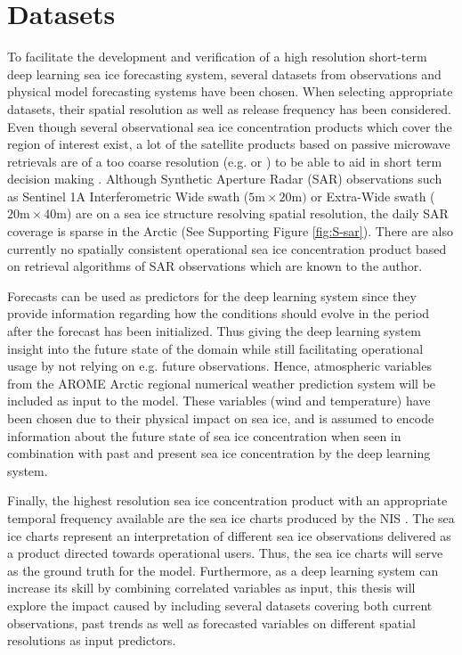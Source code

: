 \documentclass[../main/thesis.tex]{subfiles}
\begin{document}
\section{Datasets}
\label{sec:datasets}
To facilitate the development and verification of a high resolution short-term deep learning sea ice forecasting system, several datasets from observations and physical model forecasting systems have been chosen. When selecting appropriate datasets, their spatial resolution as well as release frequency has been considered. Even though several observational sea ice concentration products which cover the region of interest exist, a lot of the satellite products based on passive microwave retrievals are of a too coarse resolution (e.g. \citet{Lavergne2019} or \citet{Kern2019}) to be able to aid in short term decision making \citep{Wagner2020}. Although Synthetic Aperture Radar (SAR) observations such as Sentinel 1A Interferometric Wide swath ($5\text{m} \times 20\text{m})$ or Extra-Wide swath ($20\text{m} \times 40\text{m}$) are on a sea ice structure resolving spatial resolution, the daily SAR coverage is sparse in the Arctic (See Supporting Figure \ref{fig:S-sar}). There are also currently no spatially consistent operational sea ice concentration product based on retrieval algorithms of SAR observations which are known to the author.

Forecasts can be used as predictors for the deep learning system since they provide information regarding how the conditions should evolve in the period after the forecast has been initialized. Thus giving the deep learning system insight into the future state of the domain while still facilitating operational usage by not relying on e.g. future observations. Hence, atmospheric variables from the AROME Arctic regional numerical weather prediction system will be included as input to the model. These variables (wind and temperature) have been chosen due to their physical impact on sea ice, and is assumed to encode information about the future state of sea ice concentration when seen in combination with past and present sea ice concentration by the deep learning system.

Finally, the highest resolution sea ice concentration product with an appropriate temporal frequency available are the sea ice charts produced by the NIS \citep{Dinessen2020}. The sea ice charts represent an interpretation of different sea ice observations delivered as a product directed towards operational users. Thus, the sea ice charts will serve as the ground truth for the model. Furthermore, as a deep learning system can increase its skill by combining correlated variables as input, this thesis will explore the impact caused by including several datasets covering both current observations, past trends as well as forecasted variables on different spatial resolutions as input predictors.
\end{document}
